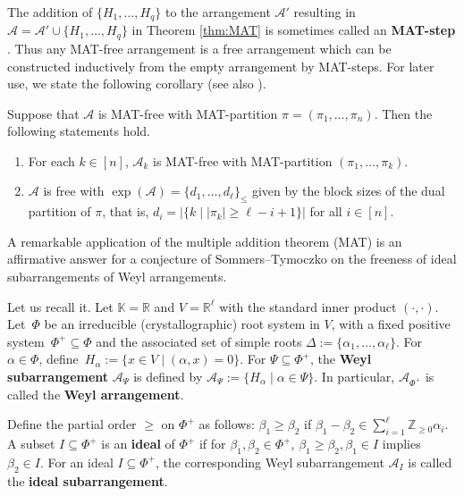 \documentclass[ALCO, Unicode,published]{cedram}
\newcommand{\Z}{\mathbb{Z}}
\newcommand{\R}{\mathbb{R}}
\newcommand{\K}{\mathbb{K}}
\newcommand{\A}{\mathcal{A}}
\begin{document}
The addition of  $\{H_1,\ldots,H_q\}$ to the arrangement $\A'$ resulting in $\A=\A'\cup\{H_1,\ldots,H_q\}$ in Theorem \ref{thm:MAT} is sometimes called an \textbf{MAT-step} \cite[Definition 2.11]{MR21}.
Thus any MAT-free arrangement is a free arrangement which can be constructed inductively from the empty arrangement by MAT-steps. 
For later use, we state the following corollary (see also \cite[Remark 2.15]{MR21}).
\begin{corollary}
\label{cor:MAT}
Suppose that $ \mathcal{A} $ is MAT-free with MAT-partition $ \pi=(\pi_{1}, \dots, \pi_{n}) $. 
Then the following statements hold. 
\begin{enumerate}[(1)]
\item For each  $ k \in [n] $, $\A_k$ is MAT-free with MAT-partition $(\pi_{1}, \dots, \pi_{k}) $.
\item $\A$ is free with $ \exp(\mathcal{A}) = \{d_{1}, \dots, d_{\ell}\}_{\leq} $ given by the block sizes of the dual partition of  $ \pi$, that is, $ d_{i} =|\{k \mid |\pi_{k}| \geq \ell-i+1\} |$ for all $i \in [n].$
\end{enumerate}
\end{corollary}




A remarkable application of the multiple addition theorem (MAT) is an affirmative answer for a conjecture of Sommers--Tymoczko \cite{ST06} on the freeness of ideal subarrangements of Weyl arrangements. 

Let us recall it. 
Let $\K=\R$ and $V = \mathbb{R}^\ell$ with the standard inner product $(\cdot,\cdot)$.
 Let~$\Phi$ be an irreducible (crystallographic) root system in $V$, with a fixed positive system~$\Phi^+ \subseteq \Phi$ and the associated set of simple roots $\Delta := \{\alpha_1,\ldots,\alpha_\ell \}$. 
 For  $\alpha \in  \Phi$, define~$H_{\alpha} :=\{x\in V \mid(\alpha,x)=0\}.$ 
 For $\Psi\subseteq\Phi^+$, the \textbf{Weyl subarrangement} $\A_{\Psi}$ is  defined by $\A_{\Psi}:= \{H_{\alpha} \mid \alpha\in\Psi\}$. 
In particular, $\A_{\Phi^+}$ is called the \textbf{Weyl arrangement}. 

Define the partial order $\ge$ on $\Phi^+$ as follows: $\beta_1 \ge \beta_2$ if $\beta_1-\beta_2 \in\sum_{i=1}^\ell \Z_{\ge 0}\alpha_i$. 
A subset $I\subseteq\Phi^+$ is an \textbf{ideal} of $\Phi^+$  if for $\beta_1,\beta_2 \in \Phi^+$, $\beta_1 \ge \beta_2, \beta_ 1 \in I$ implies $\beta_2 \in I$. 
For an ideal $I\subseteq\Phi^+$, the corresponding Weyl subarrangement $\A_{I}$ is called the \textbf{ideal subarrangement}.
\end{document}
